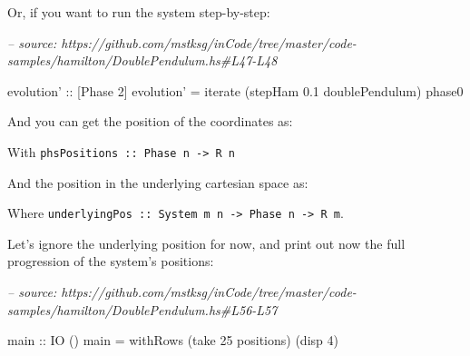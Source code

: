 \documentclass[]{article}
\newenvironment{Shaded}{}{}
\newcommand{\CommentTok}[1]{\textcolor[rgb]{0.38,0.63,0.69}{\textit{#1}}}
\newcommand{\DataTypeTok}[1]{\textcolor[rgb]{0.56,0.13,0.00}{#1}}
\newcommand{\DecValTok}[1]{\textcolor[rgb]{0.25,0.63,0.44}{#1}}
\newcommand{\FloatTok}[1]{\textcolor[rgb]{0.25,0.63,0.44}{#1}}
\newcommand{\FunctionTok}[1]{\textcolor[rgb]{0.02,0.16,0.49}{#1}}
\newcommand{\NormalTok}[1]{#1}
\newcommand{\OtherTok}[1]{\textcolor[rgb]{0.00,0.44,0.13}{#1}}
\begin{document}
Or, if you want to run the system step-by-step:

\begin{Shaded}
\begin{Highlighting}[]
\CommentTok{-- source: https://github.com/mstksg/inCode/tree/master/code-samples/hamilton/DoublePendulum.hs#L47-L48}

\OtherTok{evolution' ::}\NormalTok{ [}\DataTypeTok{Phase} \DecValTok{2}\NormalTok{]}
\NormalTok{evolution' }\FunctionTok{=}\NormalTok{ iterate (stepHam }\FloatTok{0.1}\NormalTok{ doublePendulum) phase0}
\end{Highlighting}
\end{Shaded}

And you can get the position of the coordinates as:

\begin{Shaded}
\end{Shaded}

With \texttt{phsPositions\ ::\ Phase\ n\ -\textgreater{}\ R\ n}

And the position in the underlying cartesian space as:

\begin{Shaded}
\end{Shaded}

Where
\texttt{underlyingPos\ ::\ System\ m\ n\ -\textgreater{}\ Phase\ n\ -\textgreater{}\ R\ m}.

Let's ignore the underlying position for now, and print out now the full
progression of the system's positions:

\begin{Shaded}
\begin{Highlighting}[]
\CommentTok{-- source: https://github.com/mstksg/inCode/tree/master/code-samples/hamilton/DoublePendulum.hs#L56-L57}

\OtherTok{main ::} \DataTypeTok{IO}\NormalTok{ ()}
\NormalTok{main }\FunctionTok{=}\NormalTok{ withRows (take }\DecValTok{25}\NormalTok{ positions) (disp }\DecValTok{4}\NormalTok{)}
\end{Highlighting}
\end{Shaded}
\end{document}
